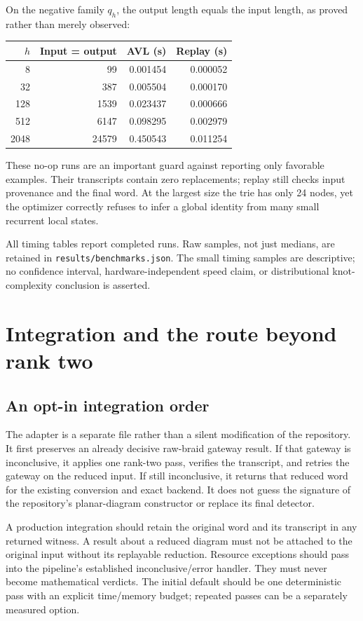 \documentclass[11pt]{article}
\theoremstyle{definition}
\theoremstyle{remark}
\begin{document}
On the negative family $q_h$, the output length equals the input length, as
proved rather than merely observed:
\begin{center}
\begin{tabular}{rrrr}
\toprule
$h$ & Input = output & AVL (s) & Replay (s)\\
\midrule
8    & 99    & 0.001454 & 0.000052\\
32   & 387   & 0.005504 & 0.000170\\
128  & 1539  & 0.023437 & 0.000666\\
512  & 6147  & 0.098295 & 0.002979\\
2048 & 24579 & 0.450543 & 0.011254\\
\bottomrule
\end{tabular}
\end{center}
These no-op runs are an important guard against reporting only favorable
examples. Their transcripts contain zero replacements; replay still checks
input provenance and the final word. At the largest size the trie has only
24 nodes, yet the optimizer correctly refuses to infer a global identity
from many small recurrent local states.

All timing tables report completed runs. Raw samples, not just medians,
are retained in \texttt{results/benchmarks.json}. The small timing samples
are descriptive; no confidence interval, hardware-independent speed claim,
or distributional knot-complexity conclusion is asserted.

\section{Integration and the route beyond rank two}
\subsection{An opt-in integration order}
The adapter is a separate file rather than a silent modification of the
repository. It first preserves an already decisive raw-braid gateway
result. If that gateway is inconclusive, it applies one rank-two pass,
verifies the transcript, and retries the gateway on the reduced input.
If still inconclusive, it returns that reduced word for the existing
conversion and exact backend. It does not guess the signature of the
repository's planar-diagram constructor or replace its final detector.

A production integration should retain the original word and its transcript
in any returned witness. A result about a reduced diagram must not be
attached to the original input without its replayable reduction. Resource
exceptions should pass into the pipeline's established inconclusive/error
handler. They must never become mathematical verdicts. The initial default
should be one deterministic pass with an explicit time/memory budget;
repeated passes can be a separately measured option.
\end{document}
